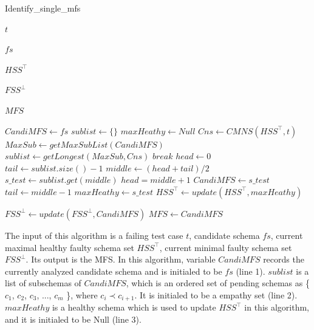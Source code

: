 \documentclass{sig-alternate-05-2015}
\begin{document}
{{\begin{algorithm}\label{al:identifyOneMFS}
  \caption{Identify\_single\_mfs}
  \begin{algorithmic}[1]
     \Require  $t$ 


     $fs$ 

     $HSS^{\top}$ 

     $FSS^{\bot}$ 

     \Ensure  $MFS$ 

   \State $CandiMFS \leftarrow fs$
   \State $sublist \leftarrow \{\}$
   \State $maxHeathy \leftarrow Null$
        \State $Cns \leftarrow CMNS(HSS^{\top}, t) $
        \State $MaxSub \leftarrow getMaxSubList(CandiMFS)$
        \State $sublist \leftarrow  getLongest(MaxSub, Cns)$
            \State $break$
         \EndIf
        \State $head  \leftarrow 0$
        \State $tail \leftarrow sublist.size() - 1 $
        \State $middle \leftarrow (head + tail) / 2$
        \State $s\_test \leftarrow sublist.get(middle)$
            \State $head = middle + 1$
            \State $CandiMFS \leftarrow s\_test$
        \Else
            \State $tail \leftarrow middle - 1  $
            \State $maxHeathy \leftarrow s\_test$
        \EndIf
        \EndWhile
        \State $HSS^{\top} \leftarrow update(HSS^{\top}, maxHeathy)$

    \EndWhile
    \State $FSS^{\bot} \leftarrow update(FSS^{\bot}, CandiMFS)$
    \State $MFS \leftarrow  CandiMFS$
  \end{algorithmic}
\end{algorithm}

The input of this algorithm is a failing test case $t$,  candidate schema $fs$, current maximal healthy faulty schema set $HSS^{\top}$, current minimal faulty schema set $FSS^{\bot}$. Its output is the MFS. In this algorithm, variable $CandiMFS$ records the currently analyzed candidate schema and is initialed to be $fs$ (line 1). $sublist$ is a list of subschemas of $CandiMFS$, which is an ordered set of pending schemas as \{ $c_{1}$, $c_{2}$, $c_{3}$, ..., $c_{m}$ \}, where $c_{i} \prec c_{i+1}$. It is initialed to be a empathy set (line 2). $maxHeathy$ is a healthy schema which is used to update  $HSS^{\top}$ in this algorithm, and it is initialed to be Null (line 3).

}}
\end{document}
